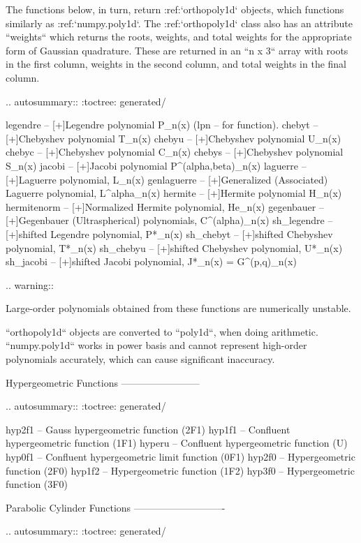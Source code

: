 \begin{DoxyVerb}
The functions below, in turn, return :ref:`orthopoly1d` objects, which
functions similarly as :ref:`numpy.poly1d`.  The :ref:`orthopoly1d`
class also has an attribute ``weights`` which returns the roots, weights,
and total weights for the appropriate form of Gaussian quadrature.
These are returned in an ``n x 3`` array with roots in the first column,
weights in the second column, and total weights in the final column.

.. autosummary::
   :toctree: generated/

   legendre    -- [+]Legendre polynomial P_n(x) (lpn -- for function).
   chebyt      -- [+]Chebyshev polynomial T_n(x)
   chebyu      -- [+]Chebyshev polynomial U_n(x)
   chebyc      -- [+]Chebyshev polynomial C_n(x)
   chebys      -- [+]Chebyshev polynomial S_n(x)
   jacobi      -- [+]Jacobi polynomial P^(alpha,beta)_n(x)
   laguerre    -- [+]Laguerre polynomial, L_n(x)
   genlaguerre -- [+]Generalized (Associated) Laguerre polynomial, L^alpha_n(x)
   hermite     -- [+]Hermite polynomial H_n(x)
   hermitenorm -- [+]Normalized Hermite polynomial, He_n(x)
   gegenbauer  -- [+]Gegenbauer (Ultraspherical) polynomials, C^(alpha)_n(x)
   sh_legendre -- [+]shifted Legendre polynomial, P*_n(x)
   sh_chebyt   -- [+]shifted Chebyshev polynomial, T*_n(x)
   sh_chebyu   -- [+]shifted Chebyshev polynomial, U*_n(x)
   sh_jacobi   -- [+]shifted Jacobi polynomial, J*_n(x) = G^(p,q)_n(x)

.. warning::

   Large-order polynomials obtained from these functions
   are numerically unstable.

   ``orthopoly1d`` objects are converted to ``poly1d``, when doing
   arithmetic.  ``numpy.poly1d`` works in power basis and cannot
   represent high-order polynomials accurately, which can cause
   significant inaccuracy.


Hypergeometric Functions
------------------------

.. autosummary::
   :toctree: generated/

   hyp2f1   -- Gauss hypergeometric function (2F1)
   hyp1f1   -- Confluent hypergeometric function (1F1)
   hyperu   -- Confluent hypergeometric function (U)
   hyp0f1   -- Confluent hypergeometric limit function (0F1)
   hyp2f0   -- Hypergeometric function (2F0)
   hyp1f2   -- Hypergeometric function (1F2)
   hyp3f0   -- Hypergeometric function (3F0)


Parabolic Cylinder Functions
----------------------------

.. autosummary::
   :toctree: generated/


\end{DoxyVerb}
